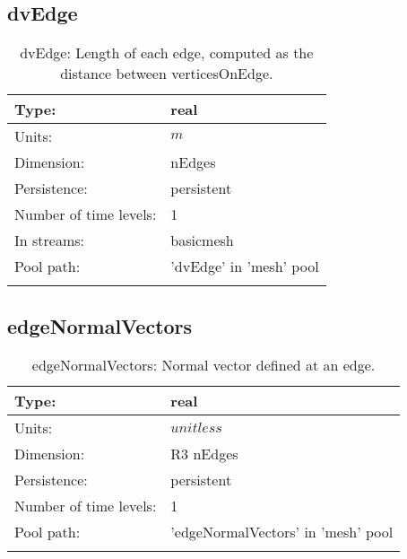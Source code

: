 \subsection[dvEdge]{dvEdge}
\label{subsec:var_sec_mesh_dvEdge}
\begin{center}
\begin{longtable}{| p{2.0in} | p{4.0in} |}
        \hline 
        Type: & real \\
        \hline 
        Units: & $m$ \\
        \hline 
        Dimension: & nEdges \\
        \hline 
        Persistence: & persistent \\
        \hline 
        Number of time levels: & 1 \\
        \hline 
		 In streams: &  basicmesh \\
        \hline 
            Pool path: & 'dvEdge' in 'mesh' pool
 \\
		 \hline 
    \caption{dvEdge: Length of each edge, computed as the distance between verticesOnEdge.}
\end{longtable}
\end{center}
\subsection[edgeNormalVectors]{edgeNormalVectors}
\label{subsec:var_sec_mesh_edgeNormalVectors}
\begin{center}
\begin{longtable}{| p{2.0in} | p{4.0in} |}
        \hline 
        Type: & real \\
        \hline 
        Units: & $unitless$ \\
        \hline 
        Dimension: & R3 nEdges \\
        \hline 
        Persistence: & persistent \\
        \hline 
        Number of time levels: & 1 \\
        \hline 
            Pool path: & 'edgeNormalVectors' in 'mesh' pool
 \\
		 \hline 
    \caption{edgeNormalVectors: Normal vector defined at an edge.}
\end{longtable}
\end{center}

